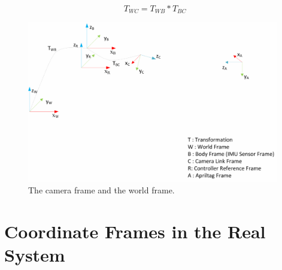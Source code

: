  \begin{equation}
 \label{eq:TWC}
 T_{WC} = T_{WB} * T_{BC}
 \end{equation}  
 
  \begin{figure}
     \centering
     \includegraphics[width=0.98\textwidth]{images/coordinate_frame_representation_v2.pdf}
     \caption{The camera frame and the world frame.}
     \label{pics:mavcoordinateframe}
  \end{figure}
  
  
\section{Coordinate Frames in the Real System}
\label{sec: CoordinatesinRealSystem}
  